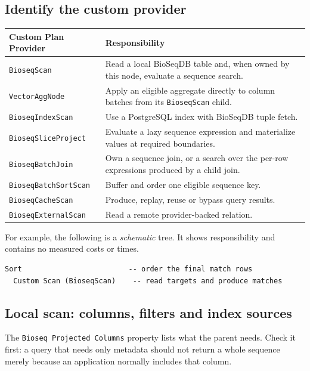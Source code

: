 \subsection{Identify the custom provider}

\begingroup\small
\begin{longtable}{@{}p{.35\linewidth}p{.60\linewidth}@{}}
\toprule
\textbf{Custom Plan Provider} & \textbf{Responsibility}\\
\midrule\endhead
\texttt{BioseqScan} & Read a local BioSeqDB table and, when owned by this
node, evaluate a sequence search.\\
\texttt{VectorAggNode} & Apply an eligible aggregate directly to column
batches from its \texttt{BioseqScan} child.\\
\texttt{BioseqIndexScan} & Use a PostgreSQL index with BioSeqDB tuple fetch.\\
\texttt{BioseqSliceProject} & Evaluate a lazy sequence expression and
materialize values at required boundaries.\\
\texttt{BioseqBatchJoin} & Own a sequence join, or a search over the
per-row expressions produced by a child join.\\
\texttt{BioseqBatchSortScan} & Buffer and order one eligible sequence key.\\
\texttt{BioseqCacheScan} & Produce, replay, reuse or bypass query results.\\
\texttt{BioseqExternalScan} & Read a remote provider-backed relation.\\
\bottomrule
\end{longtable}
\endgroup

For example, the following is a \emph{schematic} tree. It shows responsibility
and contains no measured costs or times.

\par\noindent\begin{minipage}{\linewidth}
\begin{lstlisting}[style=bioseq-appendix-text]
Sort                         -- order the final match rows
  Custom Scan (BioseqScan)    -- read targets and produce matches
\end{lstlisting}
\end{minipage}

\subsection{Local scan: columns, filters and index sources}

The \texttt{Bioseq Projected Columns} property lists what the parent needs.
Check it first: a query that needs only metadata should not return a whole
sequence merely because an application normally includes that column.

